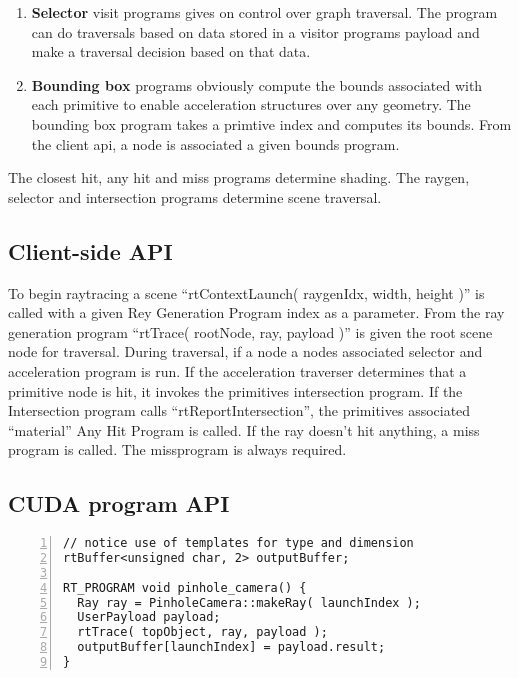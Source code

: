 \begin{enumerate}
	\item{\textbf{Selector}
		visit programs gives on control over graph traversal.
		The program can do traversals based on data stored in a visitor programs payload and make a traversal decision based 	on that data.
	}

 \item{\textbf{Bounding box}
		programs obviously compute the bounds associated with each primitive to enable acceleration structures over any geometry. The bounding box program takes a primtive index and computes its bounds. From the client api, a node is associated a given bounds program.
	}
 				
\end{enumerate}

The closest hit, any hit and miss programs determine shading. The raygen, selector and intersection programs determine scene traversal.
			 
\subsection{Client-side API}

To begin raytracing a scene ``rtContextLaunch( raygenIdx, width, height )'' is called with a given Rey Generation Program index as a parameter. From the ray generation program ``rtTrace( rootNode, ray, payload )'' is given the root scene node for traversal. During traversal, if a node a nodes associated selector and acceleration program is run.
If the acceleration traverser determines that a primitive node is hit, it invokes the primitives intersection program.
If the Intersection program calls ``rtReportIntersection'', the primitives associated ``material'' Any Hit Program is called.
If the ray doesn't hit anything, a miss program is called. The missprogram is always required.

\subsection{CUDA program API}

\begin{Verbatim}[frame=single, numbers=left, label=A simple raygen program]
// notice use of templates for type and dimension
rtBuffer<unsigned char, 2> outputBuffer; 

RT_PROGRAM void pinhole_camera() {
  Ray ray = PinholeCamera::makeRay( launchIndex );
  UserPayload payload;
  rtTrace( topObject, ray, payload );
  outputBuffer[launchIndex] = payload.result;
}
\end{Verbatim}
